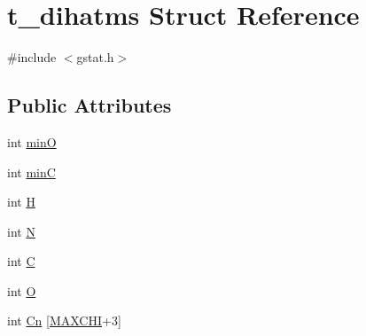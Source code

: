\hypertarget{structt__dihatms}{\section{t\-\_\-dihatms \-Struct \-Reference}
\label{structt__dihatms}
}


{\ttfamily \#include $<$gstat.\-h$>$}

\subsection*{\-Public \-Attributes}
\begin{DoxyCompactItemize}
\item 
int \hyperlink{structt__dihatms_af54ad91da23217079e3894a0a48da337}{min\-O}
\item 
int \hyperlink{structt__dihatms_acfe19da78b520250a3184f1abc22f8ff}{min\-C}
\item 
int \hyperlink{structt__dihatms_ab5e41a46124a1ec771c730a038414055}{\-H}
\item 
int \hyperlink{structt__dihatms_a0c2034f5cb4a3d4781bf4aabf47609b4}{\-N}
\item 
int \hyperlink{structt__dihatms_ac2a7f5fd48a903a5b7be6b55e5b5d9c7}{\-C}
\item 
int \hyperlink{structt__dihatms_a3ced3c2c110da1e303ba27709f1b4ee3}{\-O}
\item 
int \hyperlink{structt__dihatms_a45173b30e3c6752194fda734fd83a21a}{\-Cn} \mbox{[}\hyperlink{pp2shift_8h_ab2e4766f86b54dff80f34b59d6334484}{\-M\-A\-X\-C\-H\-I}+3\mbox{]}
\end{DoxyCompactItemize}


